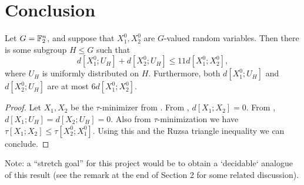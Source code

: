 \section{Conclusion}

\begin{theorem}\label{entropy-pfr}
  \leanok
  Let $G = \mathbb{F}_2^n$, and suppose that $X^0_1, X^0_2$ are $G$-valued random variables.
  Then there is some subgroup $H \leq G$ such that
  \[
    d[X^0_1;U_H] + d[X^0_2;U_H] \le 11 d[X^0_1;X^0_2],
  \]
  where $U_H$ is uniformly distributed on $H$.
  Furthermore, both $d[X^0_1;U_H]$ and $d[X^0_2;U_H]$ are at most $6 d[X^0_1;X^0_2]$.
\end{theorem}

\begin{proof}  \leanok  Let $X_1, X_2$ be the $\tau$-minimizer from .  From , $d[X_1;X_2]=0$.  From , $d[X_1;U_H] = d[X_2; U_H] = 0$.  Also from $\tau$-minimization we have $\tau[X_1;X_2] \leq \tau[X^0_2;X^0_1]$.  Using this and the Ruzsa triangle inequality we can conclude.
\end{proof}

Note: a ``stretch goal'' for this project would be to obtain a `decidable` analogue of this result (see the remark at the end of Section 2 for some related discussion).
